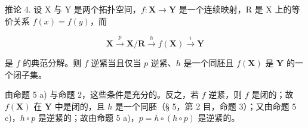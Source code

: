 推论 4. 设 X 与 Y 是两个拓扑空间，\(f: \mathbf{X} \to \mathbf{Y}\) 是一个连续映射，R 是 X 上的等价关系 \(f(x) = f(y)\)，而

\[
\mathbf {X} \xrightarrow {p} \mathbf {X} / \mathbf {R} \xrightarrow {h} f (\mathbf {X}) \xrightarrow {i} \mathbf {Y}
\]

是 \(f\) 的典范分解。则 \(f\) 逆紧当且仅当 \(p\) 逆紧、\(h\) 是一个同胚且 \(f(\mathbf{X})\) 是 \(\mathbf{Y}\) 的一个闭子集。

由命题 5 a) 与命题 2，这些条件是充分的。反之，若 \(f\) 逆紧，则 \(f\) 是闭的；故 \(f(\mathbf{X})\) 在 \(\mathbf{Y}\) 中是闭的，且 \(h\) 是一个同胚（§ 5，第 2 目，命题 3）；又由命题 5 c)，\(h \circ p\) 是逆紧的；故由命题 5 a)，\(p = \overline{h} \circ (h \circ p)\) 是逆紧的。

